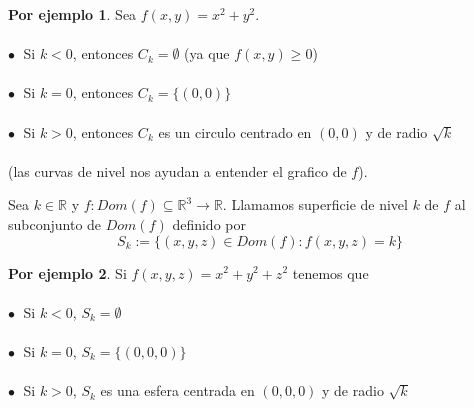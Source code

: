\documentclass{article}
\theoremstyle{definition}
\newtheorem*{ej}{Por ejemplo}
\theoremstyle{remark}
\newcommand\bl{$\bullet\;$}
\begin{document}
\begin{ej}
Sea $f(x,y)=x^2+y^2$. \\\\
\textcolor{verdep2}{\bl} Si $k<0$, entonces $C_k = \emptyset$ \big(ya que $f(x,y) \geq 0$\big) \\\\
\textcolor{verdep2}{\bl} Si $k=0$, entonces $C_k=\{(0,0)\}$ \\\\ 
\textcolor{verdep2}{\bl} Si $k > 0$, entonces $C_k$ es un circulo centrado en $(0,0)$ y de radio $\sqrt{k}$\\\\ \big(las curvas de nivel nos ayudan a entender el grafico de $f$).
\end{ej}
  \begin{figure}[h]
\centering
\def\svgwidth{1\textwidth}
\makebox[\textwidth]{
}
\end{figure} \pagebreak
\begin{defi}
  Sea $k \in \mathbb{R}$ y $ f : Dom(f) \subseteq \mathbb{R}^3 \to \mathbb{R}$. Llamamos superficie de nivel $k$ de $f$ al subconjunto de $Dom(f)$ definido por \[
    S_k:=\big\{(x,y,z) \in Dom(f) : f(x,y,z)=k\big\}
  \]
\end{defi}
\begin{ej}
  Si $f(x,y,z)=x^2+y^2+z^2$ tenemos que \\\\
  \textcolor{verdep2}{\bl} Si $k<0$, $S_k=\emptyset$ \\\\
  \textcolor{verdep2}{\bl} Si $k=0$, $S_k=\big\{(0,0,0)\big\}$\\\\
  \textcolor{verdep2}{\bl} Si $k>0$, $S_k$ es una esfera centrada en $(0,0,0)$ y de radio $\sqrt{k}$
\end{ej}
\end{document}

